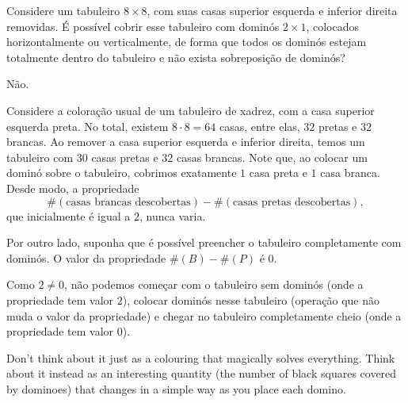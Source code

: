 \begin{exmp}
	Considere um tabuleiro $8 \times 8$, com suas casas superior esquerda e inferior direita removidas. É possível cobrir esse tabuleiro com dominós $2 \times 1$, colocados horizontalmente ou verticalmente, de forma que todos os dominós estejam totalmente dentro do tabuleiro e não exista sobreposição de dominós?
	\begin{ans}
		Não.
	\end{ans}
	\begin{sol}
		Considere a coloração usual de um tabuleiro de xadrez, com a casa superior esquerda preta. No total, existem $8\cdot8 = 64$ casas, entre elas, $32$ pretas e $32$ brancas. Ao remover a casa superior esquerda e inferior direita, temos um tabuleiro com $30$ casas pretas e $32$ casas brancas. Note que, ao colocar um dominó sobre o tabuleiro, cobrimos exatamente $1$ casa preta e $1$ casa branca. Desde modo, a propriedade \[\#(\text{casas brancas descobertas}) - \#(\text{casas pretas descobertas}),\] que inicialmente é igual a $2$, nunca varia.

		Por outro lado, suponha que é possível preencher o tabuleiro completamente com dominós. O valor da propriedade $\#(B) - \#(P)$ é $0$.

		Como $2 \neq 0$, não podemos começar com o tabuleiro sem dominós (onde a propriedade tem valor $2$), colocar dominós nesse tabuleiro (operação que não muda o valor da propriedade) e chegar no tabuleiro completamente cheio (onde a propriedade tem valor $0$).
	\end{sol}
\end{exmp}

Don’t think about it just as a colouring that magically solves everything. Think about it instead as an interesting quantity (the number of black squares covered by dominoes) that changes in a simple way as you place each domino.
